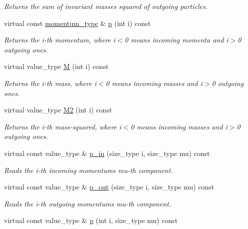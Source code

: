 \begin{DoxyCompactItemize}
\begin{DoxyCompactList}\small\item\em Returns the sum of invariant masses squared of outgoing particles. \end{DoxyCompactList}\item 
virtual const \hyperlink{a00579}{momentum\+\_\+type} \& \hyperlink{a00451_a2b06ea836491c920c2eb03ca6785e453}{p} (int i) const 
\begin{DoxyCompactList}\small\item\em Returns the i-\/th momentum, where i$<$0 means incoming momenta and i$>$0 outgoing ones. \end{DoxyCompactList}\item 
virtual value\+\_\+type \hyperlink{a00451_a8165335a5beea72aaa9c97a224d43313}{M} (int i) const 
\begin{DoxyCompactList}\small\item\em Returns the i-\/th mass, where i$<$0 means incoming masses and i$>$0 outgoing ones. \end{DoxyCompactList}\item 
virtual value\+\_\+type \hyperlink{a00451_a027d49da0ddee97e90ba8c2c66a89ebd}{M2} (int i) const 
\begin{DoxyCompactList}\small\item\em Returns the i-\/th mass-\/squared, where i$<$0 means incoming masses and i$>$0 outgoing ones. \end{DoxyCompactList}\item 
\hypertarget{a00451_a93e2650607db42a9cc3581e5ac937e6c}{}virtual const value\+\_\+type \& \hyperlink{a00451_a93e2650607db42a9cc3581e5ac937e6c}{p\+\_\+in} (size\+\_\+type i, size\+\_\+type mu) const \label{a00451_a93e2650607db42a9cc3581e5ac937e6c}

\begin{DoxyCompactList}\small\item\em Reads the i-\/th incoming momentum\textquotesingle{}s mu-\/th component. \end{DoxyCompactList}\item 
\hypertarget{a00451_a6ca6d42c507ab098658c2395ecf7a226}{}virtual const value\+\_\+type \& \hyperlink{a00451_a6ca6d42c507ab098658c2395ecf7a226}{p\+\_\+out} (size\+\_\+type i, size\+\_\+type mu) const \label{a00451_a6ca6d42c507ab098658c2395ecf7a226}

\begin{DoxyCompactList}\small\item\em Reads the i-\/th outgoing momentum\textquotesingle{}s mu-\/th component. \end{DoxyCompactList}\item 
\hypertarget{a00451_ae50c1bc5dffde20bc9cfadb235c5b0e8}{}virtual const value\+\_\+type \& \hyperlink{a00451_ae50c1bc5dffde20bc9cfadb235c5b0e8}{p} (int i, size\+\_\+type mu) const \label{a00451_ae50c1bc5dffde20bc9cfadb235c5b0e8}


\end{DoxyCompactItemize}
